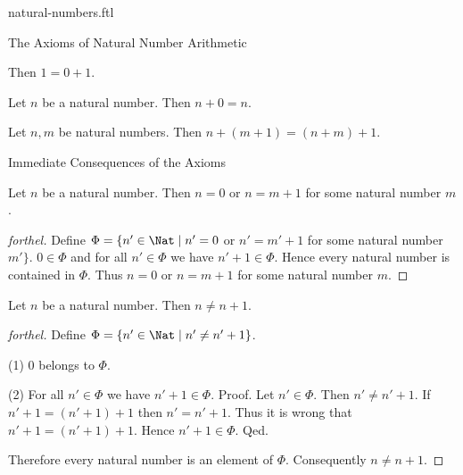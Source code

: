 \documentclass{naproche-library}
\begin{document}
\begin{smodule}[title=Natural Numbers]{natural-numbers.ftl}
\begin{sfragment}{The Axioms of Natural Number Arithmetic}
  \begin{axiom}[forthel,id=ARITHMETIC_03_5962332515874540]
    Then $1 = 0 + 1$.
  \end{axiom}

  \begin{axiom}[forthel,id=ARITHMETIC_03_4827955356237824]
    Let $n$ be a natural number.
    Then $n + 0 = n$.
  \end{axiom}

  \begin{axiom}[forthel,id=ARITHMETIC_03_4427935386238924]
    Let $n, m$ be natural numbers.
    Then $n + (m + 1) = (n + m) + 1$.
  \end{axiom}
\end{sfragment}

\begin{sfragment}{Immediate Consequences of the Axioms}
  \begin{proposition}[forthel,id=ARITHMETIC_01_4966080109871104]
    Let $n$ be a natural number.
    Then $n = 0$ or $n = m + 1$ for some natural number $m$.
  \end{proposition}
  \begin{proof}[forthel]
    Define $\Phi = \{ n' \in \Nat \mid n' = 0$ or $n' = m' + 1$ for some natural number $m' \}$.
    $0 \in \Phi$ and for all $n' \in  \Phi$ we have $n' + 1 \in \Phi$.
    Hence every natural number is contained in $\Phi$.
    Thus $n = 0$ or $n = m + 1$ for some natural number $m$.
  \end{proof}

  \begin{proposition}[forthel,id=ARITHMETIC_01_5996049267163136]
    Let $n$ be a natural number.
    Then $n \neq n + 1$.
  \end{proposition}
  \begin{proof}[forthel]
    Define $\Phi = \{ n' \in \Nat \mid n' \neq n' + 1 \}$.

    (1) $0$ belongs to $\Phi$.

    (2) For all $n' \in \Phi$ we have $n' + 1 \in \Phi$. \newline
    Proof.
      Let $n' \in \Phi$.
      Then $n' \neq n' + 1$.
      If $n' + 1 = (n' + 1) + 1$ then $n' = n' + 1$.
      Thus it is wrong that $n' + 1 = (n' + 1) + 1$.
      Hence $n' + 1 \in \Phi$.
    Qed.

    Therefore every natural number is an element of $\Phi$.
    Consequently $n \neq n + 1$.
  \end{proof}
\end{sfragment}


\end{smodule}
\end{document}
